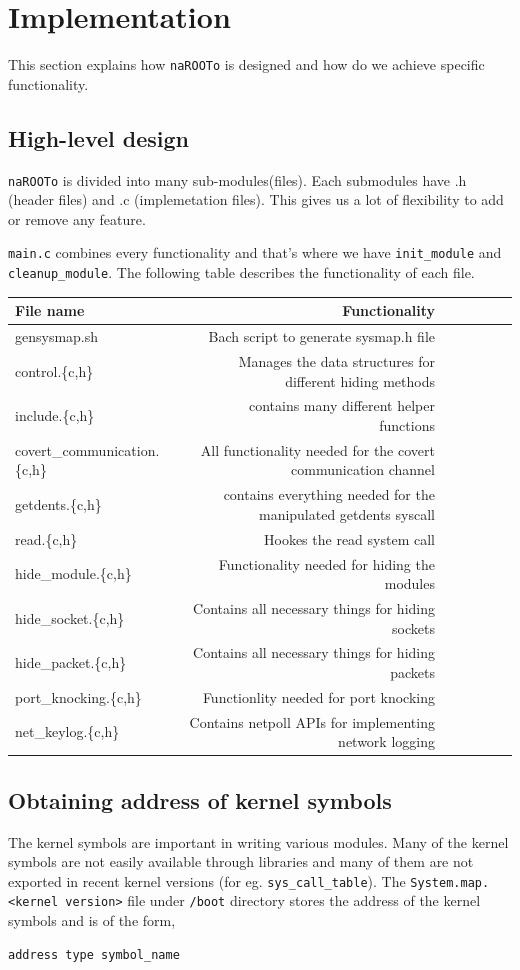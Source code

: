 \documentclass[10pt, letterpaper]{scrartcl}
\begin{document}
\section{Implementation}
This section explains how \texttt{naROOTo} is designed and how do we achieve specific functionality. 

\subsection{High-level design}
\texttt{naROOTo} is divided into many sub-modules(files). Each submodules have .h (header files) and .c (implemetation files).
This gives us a lot of flexibility to add or remove any feature.

\texttt{main.c} combines every functionality and that's where we have \texttt{init\_module} and \texttt{cleanup\_module}.
The following table describes the functionality of each file.



\begin{tabular}{l*{6}r}
File name             & Functionality \\
\hline
gensysmap.sh & Bach script to generate sysmap.h file\\
control.\{c,h\} & Manages the data structures for different hiding methods\\
include.\{c,h\} & contains many different helper functions   \\
covert\_communication.\{c,h\} & All functionality needed for the covert communication channel \\
getdents.\{c,h\} & contains everything needed for the manipulated getdents syscall\\
read.\{c,h\} & Hookes the read system call \\
hide\_module.\{c,h\} & Functionality needed for hiding the modules\\
hide\_socket.\{c,h\} & Contains all necessary things for hiding sockets\\
hide\_packet.\{c,h\} & Contains all necessary things for hiding packets\\
port\_knocking.\{c,h\} & Functionlity needed for port knocking\\
net\_keylog.\{c,h\} & Contains netpoll APIs for implementing network logging\\

\end{tabular}




\subsection{Obtaining address of kernel symbols}
The kernel symbols are important in writing various modules. Many of the kernel symbols are not easily available through libraries 
and many of them are not exported in recent kernel versions (for eg. \texttt{sys\_call\_table}).
The \texttt{System.map.<kernel version>} file under \texttt{/boot} directory stores the address of the kernel symbols and is of the form, 
\begin{verbatim}
address type symbol_name
\end{verbatim}
\end{document}

